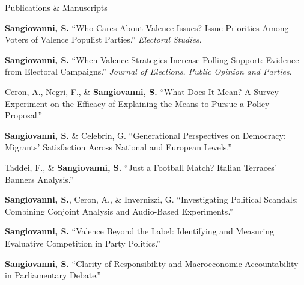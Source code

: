 \documentclass{cv}
\begin{document}
\begin{rSection}{Publications \& Manuscripts}

\subtitle{Revise \& Resubmit}

\begin{pubEntry}
\textbf{Sangiovanni, S.} \enquote{Who Cares About Valence Issues? Issue Priorities Among Voters of Valence Populist Parties.} \textit{Electoral Studies}.
\end{pubEntry}

\begin{pubEntry}
\textbf{Sangiovanni, S.} \enquote{When Valence Strategies Increase Polling Support: Evidence from Electoral Campaigns.} \textit{Journal of Elections, Public Opinion and Parties}.
\end{pubEntry}

\subtitle{Under Review}

\begin{pubEntry}
Ceron, A., Negri, F., \& \textbf{Sangiovanni, S.} \enquote{What Does It Mean? A Survey Experiment on the Efficacy of Explaining the Means to Pursue a Policy Proposal.}
\end{pubEntry}

\begin{pubEntry}
\textbf{Sangiovanni, S.} \& Celebrin, G. \enquote{Generational Perspectives on Democracy: Migrants' Satisfaction Across National and European Levels.}
\end{pubEntry}

\begin{pubEntry}
Taddei, F., \& \textbf{Sangiovanni, S.} \enquote{Just a Football Match? Italian Terraces' Banners Analysis.}
\end{pubEntry}

\subtitle{Working Papers}

\begin{pubEntry}
\textbf{Sangiovanni, S.}, Ceron, A., \& Invernizzi, G. \enquote{Investigating Political Scandals: Combining Conjoint Analysis and Audio-Based Experiments.}
\end{pubEntry}

\begin{pubEntry}
\textbf{Sangiovanni, S.} \enquote{Valence Beyond the Label: Identifying and Measuring Evaluative Competition in Party Politics.}
\end{pubEntry}

\begin{pubEntry}
\textbf{Sangiovanni, S.} \enquote{Clarity of Responsibility and Macroeconomic Accountability in Parliamentary Debate.}
\end{pubEntry}


\end{rSection}
\end{document}
